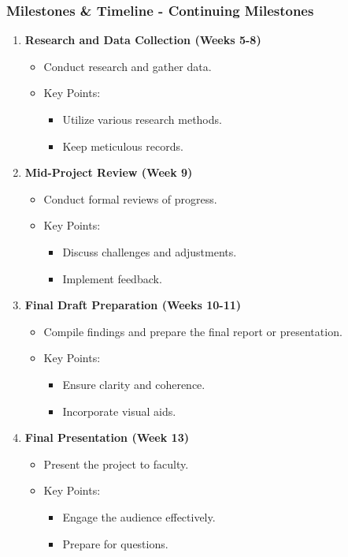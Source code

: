 \documentclass[aspectratio=169]{beamer}
\begin{document}
\begin{frame}[fragile]
    \frametitle{Milestones \& Timeline - Continuing Milestones}
    \begin{enumerate}[resume]
        \item \textbf{Research and Data Collection (Weeks 5-8)}
        \begin{itemize}
            \item Conduct research and gather data.
            \item Key Points:
            \begin{itemize}
                \item Utilize various research methods.
                \item Keep meticulous records.
            \end{itemize}
        \end{itemize}

        \item \textbf{Mid-Project Review (Week 9)}
        \begin{itemize}
            \item Conduct formal reviews of progress.
            \item Key Points:
            \begin{itemize}
                \item Discuss challenges and adjustments.
                \item Implement feedback.
            \end{itemize}
        \end{itemize}
        
        \item \textbf{Final Draft Preparation (Weeks 10-11)}
        \begin{itemize}
            \item Compile findings and prepare the final report or presentation.
            \item Key Points:
            \begin{itemize}
                \item Ensure clarity and coherence.
                \item Incorporate visual aids.
            \end{itemize}
        \end{itemize}

        \item \textbf{Final Presentation (Week 13)}
        \begin{itemize}
            \item Present the project to faculty.
            \item Key Points:
            \begin{itemize}
                \item Engage the audience effectively.
                \item Prepare for questions.
            \end{itemize}
        \end{itemize}
    \end{enumerate}
\end{frame}
\end{document}

